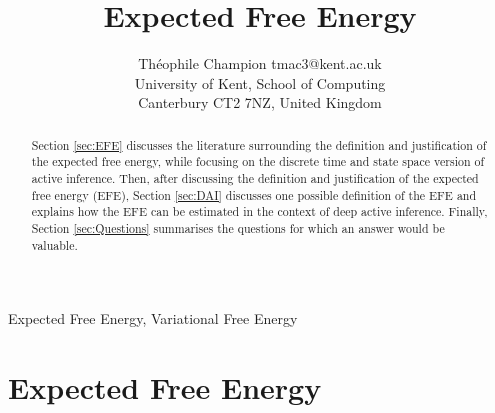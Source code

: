 \documentclass[twoside,11pt]{article}
\begin{document}
\title{Expected Free Energy}

\author{\name Théophile Champion \email tmac3@kent.ac.uk \\
       \addr University of Kent, School of Computing\\
       Canterbury CT2 7NZ, United Kingdom
       }
       

\maketitle

\begin{abstract}%
Section \ref{sec:EFE} discusses the literature surrounding the definition and justification of the expected free energy, while focusing on the discrete time and state space version of active inference. Then, after discussing the definition and justification of the expected free energy (EFE), Section \ref{sec:DAI} discusses one possible definition of the EFE and explains how the EFE can be estimated in the context of deep active inference. Finally, Section \ref{sec:Questions} summarises the questions for which an answer would be valuable.
\end{abstract}

\begin{keywords}
Expected Free Energy, Variational Free Energy
\end{keywords}

\section{Expected Free Energy} \label{sec:EFE}
\end{document}
